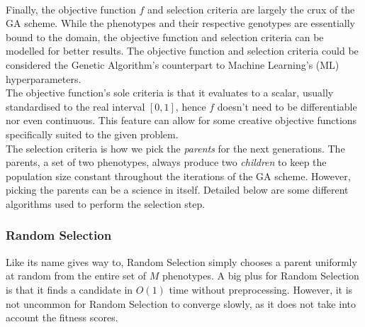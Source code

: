 \\
Finally, the objective function $f$ and selection criteria are largely the crux of the GA scheme. While the phenotypes and their respective genotypes are essentially bound to the domain, the objective function and selection criteria can be modelled for better results. The objective function and selection criteria could be considered the Genetic Algorithm's counterpart to Machine Learning's (ML) hyperparameters.
\\
The objective function's sole criteria is that it evaluates to a scalar, usually standardised to the real interval $[0,1]$, hence $f$ doesn't need to be differentiable nor even continuous. This feature can allow for some creative objective functions specifically suited to the given problem.
\\
The selection criteria is how we pick the \textit{parents} for the next generations. The parents, a set of two phenotypes, always produce two \textit{children} to keep the population size constant throughout the iterations of the GA scheme. However, picking the parents can be a science in itself. Detailed below are some different algorithms used to perform the selection step.

\subsubsection{Random Selection}
Like its name gives way to, Random Selection simply chooses a parent uniformly at random from the entire set of $M$ phenotypes. A big plus for Random Selection is that it finds a candidate in $O(1)$ time without preprocessing. However, it is not uncommon for Random Selection to converge slowly, as it does not take into account the fitness scores. 

